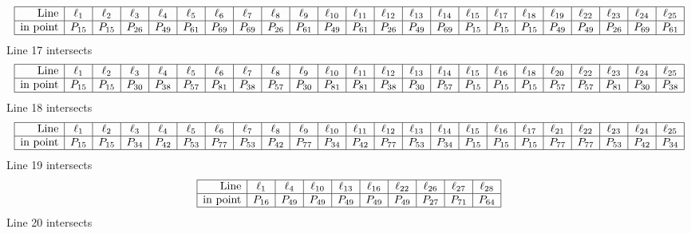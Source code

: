 \documentclass{article}
\begin{document}
{$$\begin{array}{|r*{22}{|c}|}
\hline
\mbox{Line}  & \ell_{1} & \ell_{2} & \ell_{3} & \ell_{4} & \ell_{5} & \ell_{6} & \ell_{7} & \ell_{8} & \ell_{9} & \ell_{10} & \ell_{11} & \ell_{12} & \ell_{13} & \ell_{14} & \ell_{15} & \ell_{17} & \ell_{18} & \ell_{19} & \ell_{22} & \ell_{23} & \ell_{24} & \ell_{25}\\
\hline
\mbox{in point}  & P_{15} & P_{15} & P_{26} & P_{49} & P_{61} & P_{69} & P_{69} & P_{26} & P_{61} & P_{49} & P_{61} & P_{26} & P_{49} & P_{69} & P_{15} & P_{15} & P_{15} & P_{49} & P_{49} & P_{26} & P_{69} & P_{61}\\
\hline
\end{array}
$$
Line 17 intersects 
$$
\begin{array}{|r*{22}{|c}|}
\hline
\mbox{Line}  & \ell_{1} & \ell_{2} & \ell_{3} & \ell_{4} & \ell_{5} & \ell_{6} & \ell_{7} & \ell_{8} & \ell_{9} & \ell_{10} & \ell_{11} & \ell_{12} & \ell_{13} & \ell_{14} & \ell_{15} & \ell_{16} & \ell_{18} & \ell_{20} & \ell_{22} & \ell_{23} & \ell_{24} & \ell_{25}\\
\hline
\mbox{in point}  & P_{15} & P_{15} & P_{30} & P_{38} & P_{57} & P_{81} & P_{38} & P_{57} & P_{30} & P_{81} & P_{81} & P_{38} & P_{30} & P_{57} & P_{15} & P_{15} & P_{15} & P_{57} & P_{57} & P_{81} & P_{30} & P_{38}\\
\hline
\end{array}
$$
Line 18 intersects 
$$
\begin{array}{|r*{22}{|c}|}
\hline
\mbox{Line}  & \ell_{1} & \ell_{2} & \ell_{3} & \ell_{4} & \ell_{5} & \ell_{6} & \ell_{7} & \ell_{8} & \ell_{9} & \ell_{10} & \ell_{11} & \ell_{12} & \ell_{13} & \ell_{14} & \ell_{15} & \ell_{16} & \ell_{17} & \ell_{21} & \ell_{22} & \ell_{23} & \ell_{24} & \ell_{25}\\
\hline
\mbox{in point}  & P_{15} & P_{15} & P_{34} & P_{42} & P_{53} & P_{77} & P_{53} & P_{42} & P_{77} & P_{34} & P_{42} & P_{77} & P_{53} & P_{34} & P_{15} & P_{15} & P_{15} & P_{77} & P_{77} & P_{53} & P_{42} & P_{34}\\
\hline
\end{array}
$$
Line 19 intersects 
$$
\begin{array}{|r*{9}{|c}|}
\hline
\mbox{Line}  & \ell_{1} & \ell_{4} & \ell_{10} & \ell_{13} & \ell_{16} & \ell_{22} & \ell_{26} & \ell_{27} & \ell_{28}\\
\hline
\mbox{in point}  & P_{16} & P_{49} & P_{49} & P_{49} & P_{49} & P_{49} & P_{27} & P_{71} & P_{64}\\
\hline
\end{array}
$$
Line 20 intersects 
$$
$$}
\end{document}
